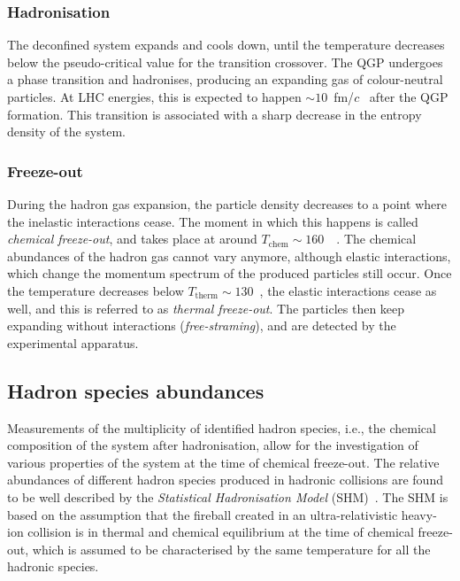 \subsubsection{Hadronisation}
The deconfined system expands and cools down, until the temperature decreases below the pseudo-critical value for the transition crossover. The QGP undergoes a phase transition and hadronises, producing an expanding gas of colour-neutral particles. At LHC energies, this is expected to happen $\sim 10$~fm/$c$~\cite{ALICE:2011dyt} after the QGP formation. This transition is associated with a sharp decrease in the entropy density of the system.

\subsubsection{Freeze-out}
During the hadron gas expansion, the particle density decreases to a point where the inelastic interactions cease. The moment in which this happens is called \emph{chemical freeze-out}, and takes place at around $T_\mathrm{chem}\sim160$~\mev~\cite{Andronic:2017pug}. The chemical abundances of the hadron gas cannot vary anymore, although elastic interactions, which change the momentum spectrum of the produced particles still occur. Once the temperature decreases below $T_\mathrm{therm}\sim 130$~\mev, the elastic interactions cease as well, and this is referred to as \emph{thermal freeze-out}. The particles then keep expanding without interactions (\emph{free-straming}), and are detected by the experimental apparatus.

\subsection{Hadron species abundances}
Measurements of the multiplicity of identified hadron species, i.e., the chemical composition of the system after hadronisation, allow for the investigation of various properties of the system at the time of chemical freeze-out. The relative abundances of different hadron species produced in hadronic collisions are found to be well described by the \emph{Statistical Hadronisation Model} (SHM)~\cite{Braun-Munzinger:2003pwq}. The SHM is based on the assumption that the fireball created in an ultra-relativistic heavy-ion collision is in thermal and chemical equilibrium at the time of chemical freeze-out, which is assumed to be characterised by the same temperature for all the hadronic species.

